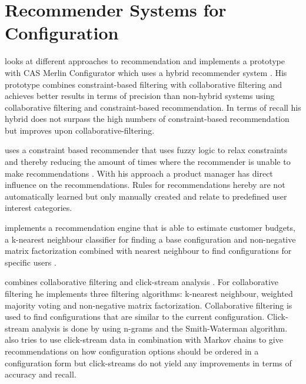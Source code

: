 \section{Recommender Systems for Configuration}
\label{sec:Related_Work:RecommenderSystemsForConfiguration}
\begin{description}[style=unboxed, leftmargin=0cm, font=\normalfont]
    \item[\citeauthor{rubinshteynEntwicklungHybridenRecommender2018}] looks at different approaches to recommendation and implements a prototype with CAS Merlin Configurator which uses a hybrid recommender system \cite{rubinshteynEntwicklungHybridenRecommender2018}. His prototype combines constraint-based filtering with collaborative filtering and achieves better results in terms of precision than non-hybrid systems using collaborative filtering and constraint-based recommendation. In terms of recall his hybrid does not surpass the high numbers of constraint-based recommendation but improves upon collaborative-filtering. 

    \item [\citeauthor{benzMoeglichkeitenIntelligenterEmpfehlungssysteme2017}] uses a constraint based recommender that uses fuzzy logic to relax constraints and thereby reducing the amount of times where the recommender is unable to make recommendations \cite{benzMoeglichkeitenIntelligenterEmpfehlungssysteme2017}. With his approach a product manager has direct influence on the recommendations. Rules for recommendations hereby are not automatically learned but only manually created and relate to predefined user interest categories.

    \item [\citeauthor{ullmannEntwurfUndUmsetzung2017}] implements a recommendation engine that is able to estimate customer budgets, a k-nearest neighbour classifier for finding a base configuration and non-negative matrix factorization combined with nearest neighbour to find configurations for specific users \cite{ullmannEntwurfUndUmsetzung2017}. \par

    \item[\citeauthor{wetzelPersonalisierterUndLernender2017}] combines collaborative filtering and click-stream analysis \cite{wetzelPersonalisierterUndLernender2017}. For collaborative filtering he implements three filtering algorithms: k-nearest neighbour, weighted majority voting and non-negative matrix factorization. Collaborative filtering is used to find configurations that are similar to the current configuration. Click-stream analysis is done by using n-grams and the Smith-Waterman algorithm. \citeauthor{wetzelPersonalisierterUndLernender2017} also tries to use click-stream data in combination with Markov chains to give recommendations on how configuration options should be ordered in a configuration form but click-streams do not yield any improvements in terms of accuracy and recall.


\end{description}
